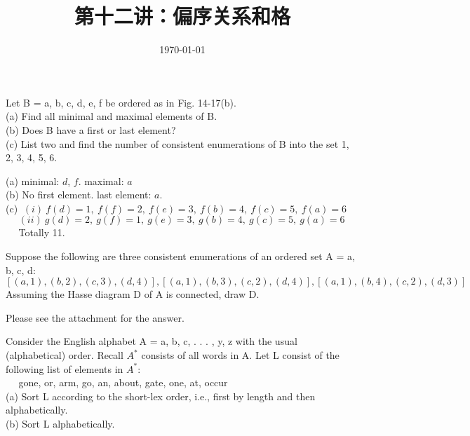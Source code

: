 \documentclass[11pt, a4paper, UTF8]{ctexart}
\title{第十二讲：偏序关系和格}
\date{\today}     %
\begin{document}
\maketitle
\noplagiarism	%
\beginthishw	%

\begin{problem}[SM: 14.32]	%
  Let B = {a, b, c, d, e, f } be ordered as in Fig. 14-17(b).\\
(a) Find all minimal and maximal elements of B.\\
(b) Does B have a first or last element?\\
(c) List two and find the number of consistent enumerations of B into the set {1, 2, 3, 4, 5, 6}.
\end{problem}



\begin{solution}
  (a) minimal: $d$, $f$.       maximal: $a$\\
  (b) No first element.        last element: $a$.\\
  (c) $~(i)~f(d)=1,~f(f)=2,~f(e)=3,~f(b)=4,~f(c)=5,~f(a)=6$\\
  $~~~~~~(ii)~g(d)=2,~g(f)=1,~g(e)=3,~g(b)=4,~g(c)=5,~g(a)=6$\\
  $~~~~~~$Totally 11.
\end{solution}

\begin{problem}[SM: 14.44]
  Suppose the following are three consistent enumerations of an ordered set A = {a, b, c, d}:\\
$[(a, 1), (b, 2), (c, 3), (d, 4)],
[(a, 1), (b, 3), (c, 2), (d, 4)],
[(a, 1), (b, 4), (c, 2), (d, 3)]$\\
Assuming the Hasse diagram D of A is connected, draw D.
\end{problem}

\begin{solution}
  Please see the attachment for the answer.
\end{solution}
\begin{problem}[SM: 14.46]
  Consider the English alphabet A = {a, b, c, . . . , y, z} with the usual (alphabetical) order. Recall $A^{*}$ consists of all
words in A. Let L consist of the following list of elements in $A^{*}$:\\
$~~~~~~$gone, or, arm, go, an, about, gate, one, at, occur\\
(a) Sort L according to the short-lex order, i.e., first by length and then alphabetically.\\
(b) Sort L alphabetically.
\end{problem}
\end{document}
